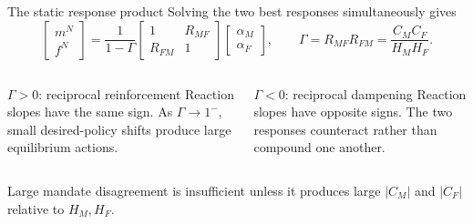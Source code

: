 \documentclass[10pt,aspectratio=169]{beamer}
\begin{document}
\begin{frame}{The static response product}
Solving the two best responses simultaneously gives
\begin{equation*}
\begin{bmatrix}m^N\\f^N\end{bmatrix}
=\frac{1}{1-\Gamma}
\begin{bmatrix}1&R_{MF}\\R_{FM}&1\end{bmatrix}
\begin{bmatrix}\alpha_M\\\alpha_F\end{bmatrix},
\qquad
\boxed{\Gamma=R_{MF}R_{FM}=\frac{C_MC_F}{H_MH_F}.}
\end{equation*}
\begin{columns}[T,onlytextwidth]
\begin{block}{$\Gamma>0$: reciprocal reinforcement}
Reaction slopes have the same sign. As $\Gamma\to1^{-}$, small desired-policy
shifts produce large equilibrium actions.
\end{block}
\begin{block}{$\Gamma<0$: reciprocal dampening}
Reaction slopes have opposite signs. The two responses counteract rather than
compound one another.
\end{block}
\end{columns}
\vfill
\centering Large mandate disagreement is insufficient unless it produces large
$|C_M|$ and $|C_F|$ relative to $H_M,H_F$.
\end{frame}
\end{document}
